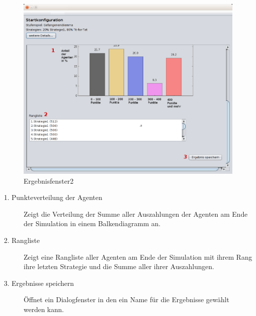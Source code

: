 \begin{figure}[hp] 
  \centering
     \includegraphics[width=1.1\textwidth]{GUI_Entwurf/Ergebnisfenster2.png}
  \caption{Ergebnisfenster2}
  \label{fig:Bild8}
\end{figure}

\begin{description}

\item[1. Punkteverteilung der Agenten] Zeigt die Verteilung der Summe aller Auszahlungen der Agenten am Ende der Simulation in einem Balkendiagramm an.

\item[2. Rangliste] Zeigt eine Rangliste aller Agenten am Ende der Simulation mit ihrem Rang ihre letzten Strategie und die Summe aller ihrer Auszahlungen.

\item[3. Ergebnisse speichern] Öffnet ein Dialogfenster in den ein Name für die Ergebnisse gewählt werden kann.


\end{description}

